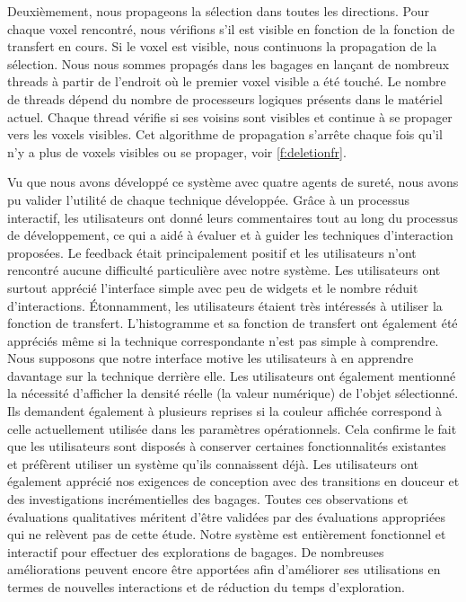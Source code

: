 Deuxièmement, nous propageons la sélection dans toutes les directions. Pour chaque voxel rencontré, nous vérifions s'il est visible en fonction de la fonction de transfert en cours. Si le voxel est visible, nous continuons la propagation de la sélection. Nous nous sommes propagés dans les bagages en lançant de nombreux threads à partir de l'endroit où le premier voxel visible a été touché. Le nombre de threads dépend du nombre de processeurs logiques présents dans le matériel actuel. Chaque thread vérifie si ses voisins sont visibles et continue à se propager vers les voxels visibles. Cet algorithme de propagation s'arrête chaque fois qu'il n'y a plus de voxels visibles ou se propager, voir \autoref{f:deletionfr}.




Vu que nous avons développé ce système avec quatre agents de sureté, nous avons pu valider l’utilité de chaque technique développée. Grâce à un processus interactif, les utilisateurs ont donné leurs commentaires tout au long du processus de développement, ce qui a aidé à évaluer et à guider les techniques d'interaction proposées. Le feedback était principalement positif et les utilisateurs n'ont rencontré aucune difficulté particulière avec notre système. Les utilisateurs ont surtout apprécié l'interface simple avec peu de widgets et le nombre réduit d'interactions. Étonnamment, les utilisateurs étaient très intéressés à utiliser la fonction de transfert. L'histogramme et sa fonction de transfert ont également été appréciés même si la technique correspondante n'est pas simple à comprendre. Nous supposons que notre interface motive les utilisateurs à en apprendre davantage sur la technique derrière elle. Les utilisateurs ont également mentionné la nécessité d'afficher la densité réelle (la valeur numérique) de l'objet sélectionné. Ils demandent également à plusieurs reprises si la couleur affichée correspond à celle actuellement utilisée dans les paramètres opérationnels. Cela confirme le fait que les utilisateurs sont disposés à conserver certaines fonctionnalités existantes et préfèrent utiliser un système qu'ils connaissent déjà.
Les utilisateurs ont également apprécié nos exigences de conception avec des transitions en douceur et des investigations incrémentielles des bagages.
Toutes ces observations et évaluations qualitatives méritent d'être validées par des évaluations appropriées qui ne relèvent pas de cette étude.
Notre système est entièrement fonctionnel et interactif pour effectuer des explorations de bagages. De nombreuses améliorations peuvent encore être apportées afin d'améliorer ses utilisations en termes de nouvelles interactions et de réduction du temps d'exploration.
